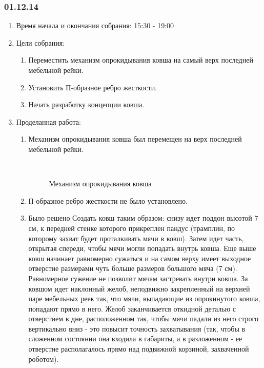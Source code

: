 \subsubsection{01.12.14}

\begin{enumerate}
	\item Время начала и окончания собрания:
	15:30 - 19:00
	\item Цели собрания:
	\begin{enumerate}
	  \item Переместить механизм опрокидывания ковша на самый верх последней мебельной рейки.
	  
	  \item Установить П-образное ребро жесткости.
	  
	  \item Начать разработку концепции ковша.
	  
    \end{enumerate}
	\item Проделанная работа:
	\begin{enumerate}
	  \item Механизм опрокидывания ковша был перемещен на верх последней мебельной рейки.
	  
	  \begin{figure}[H]
	  	\begin{minipage}[h]{0.2\linewidth}
	  		\center  
	  	\end{minipage}
	  	\begin{minipage}[h]{0.6\linewidth}
	  		\caption{Механизм опрокидывания ковша}
	  	\end{minipage}
	  \end{figure}
	  
	  \item П-образное ребро жесткости не было установлено.
	  
	  \item Было решено Создать ковш таким образом: снизу идет поддон высотой 7 см, к передней стенке которого прикреплен пандус (трамплин, по которому захват будет проталкивать мячи в ковш). Затем идет часть, открытая спереди, чтобы мячи могли попадать внутрь ковша. Еще выше ковш начинает равномерно сужаться и на самом верху имеет выходное отверстие размерами чуть больше размеров большого мяча (7 см). Равномерное сужение не позволит мячам застревать внутри ковша. За ковшом идет наклонный желоб, неподвижно закрепленный на верхней паре мебельных реек так, что мячи, выпадающие из опрокинутого ковша, попадают прямо в него. Желоб заканчивается откидной деталью с отверстием в дне, расположенном так, чтобы мячи падали из него строго вертикально вниз - это повысит точность захватывания (так, чтобы в сложенном состоянии она входила в габариты, а в разложенном - ее отверстие располагалось прямо над подвижной корзиной, захваченной роботом).
	  

\end{enumerate}
\end{enumerate}
